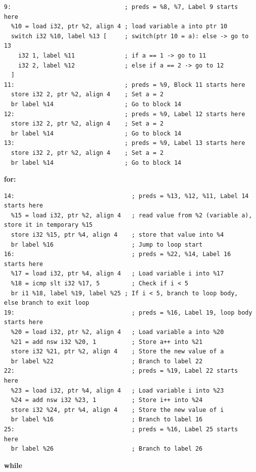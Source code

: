 \documentclass[11pt,a4paper]{article}
\begin{document}
\begin{lstlisting}
9:                                ; preds = %8, %7, Label 9 starts here
  %10 = load i32, ptr %2, align 4 ; load variable a into ptr 10
  switch i32 %10, label %13 [     ; switch(ptr 10 = a): else -> go to 13
    i32 1, label %11              ; if a == 1 -> go to 11
    i32 2, label %12              ; else if a == 2 -> go to 12
  ]
11:                               ; preds = %9, Block 11 starts here
  store i32 2, ptr %2, align 4    ; Set a = 2
  br label %14                    ; Go to block 14
12:                               ; preds = %9, Label 12 starts here
  store i32 2, ptr %2, align 4    ; Set a = 2
  br label %14                    ; Go to block 14
13:                               ; preds = %9, Label 13 starts here
  store i32 2, ptr %2, align 4    ; Set a = 2
  br label %14                    ; Go to block 14
\end{lstlisting}

\textbf{for:}


\begin{lstlisting}
14:                                 ; preds = %13, %12, %11, Label 14 starts here
  %15 = load i32, ptr %2, align 4   ; read value from %2 (variable a), store it in temporary %15
  store i32 %15, ptr %4, align 4    ; store that value into %4
  br label %16                      ; Jump to loop start
16:                                 ; preds = %22, %14, Label 16 starts here
  %17 = load i32, ptr %4, align 4   ; Load variable i into %17
  %18 = icmp slt i32 %17, 5         ; Check if i < 5
  br i1 %18, label %19, label %25 ; If i < 5, branch to loop body, else branch to exit loop
19:                                 ; preds = %16, Label 19, loop body starts here
  %20 = load i32, ptr %2, align 4   ; Load variable a into %20
  %21 = add nsw i32 %20, 1          ; Store a++ into %21
  store i32 %21, ptr %2, align 4    ; Store the new value of a
  br label %22                      ; Branch to label 22
22:                                 ; preds = %19, Label 22 starts here
  %23 = load i32, ptr %4, align 4   ; Load variable i into %23
  %24 = add nsw i32 %23, 1          ; Store i++ into %24
  store i32 %24, ptr %4, align 4    ; Store the new value of i
  br label %16                      ; Branch to label 16
25:                                 ; preds = %16, Label 25 starts here
  br label %26                      ; Branch to label 26
\end{lstlisting}

\textbf{while}
\end{document}
